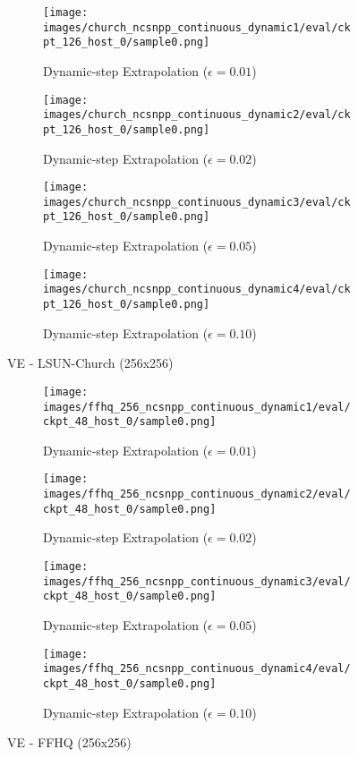 \documentclass{article}
\begin{document}
\begin{figure}[ht] 
  \begin{subfigure}[b]{0.5\linewidth}
    \centering
    \texttt{[image: images/church\_ncsnpp\_continuous\_dynamic1/eval/ckpt\_126\_host\_0/sample0.png]} 
    \caption{Dynamic-step Extrapolation ($\epsilon=0.01$)} 
  \end{subfigure}
  \begin{subfigure}[b]{0.5\linewidth}
    \centering
    \texttt{[image: images/church\_ncsnpp\_continuous\_dynamic2/eval/ckpt\_126\_host\_0/sample0.png]}
    \caption{Dynamic-step Extrapolation ($\epsilon=0.02$)} 
  \end{subfigure}
  \begin{subfigure}[b]{0.5\linewidth}
    \centering
    \texttt{[image: images/church\_ncsnpp\_continuous\_dynamic3/eval/ckpt\_126\_host\_0/sample0.png]} 
    \caption{Dynamic-step Extrapolation ($\epsilon=0.05$)} 
  \end{subfigure}
  \begin{subfigure}[b]{0.5\linewidth}
    \centering
    \texttt{[image: images/church\_ncsnpp\_continuous\_dynamic4/eval/ckpt\_126\_host\_0/sample0.png]}
    \caption{Dynamic-step Extrapolation ($\epsilon=0.10$)} 
  \end{subfigure}
  \caption{VE - LSUN-Church (256x256)}
  \label{fig15} 
\end{figure}

\begin{figure}[ht] 
  \begin{subfigure}[b]{0.5\linewidth}
    \centering
    \texttt{[image: images/ffhq\_256\_ncsnpp\_continuous\_dynamic1/eval/ckpt\_48\_host\_0/sample0.png]}
    \caption{Dynamic-step Extrapolation ($\epsilon=0.01$)} 
  \end{subfigure}
  \begin{subfigure}[b]{0.5\linewidth}
    \centering
    \texttt{[image: images/ffhq\_256\_ncsnpp\_continuous\_dynamic2/eval/ckpt\_48\_host\_0/sample0.png]}
    \caption{Dynamic-step Extrapolation ($\epsilon=0.02$)} 
  \end{subfigure}
  \begin{subfigure}[b]{0.5\linewidth}
    \centering
    \texttt{[image: images/ffhq\_256\_ncsnpp\_continuous\_dynamic3/eval/ckpt\_48\_host\_0/sample0.png]}
    \caption{Dynamic-step Extrapolation ($\epsilon=0.05$)} 
  \end{subfigure}
  \begin{subfigure}[b]{0.5\linewidth}
    \centering
    \texttt{[image: images/ffhq\_256\_ncsnpp\_continuous\_dynamic4/eval/ckpt\_48\_host\_0/sample0.png]}
    \caption{Dynamic-step Extrapolation ($\epsilon=0.10$)} 
  \end{subfigure}
  \caption{VE - FFHQ (256x256)}
  \label{fig16} 
\end{figure}
\end{document}
